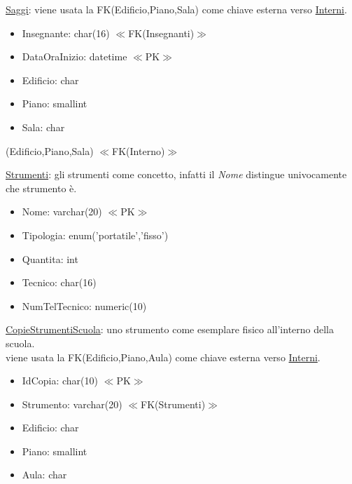 \documentclass{article}
\begin{document}
\medskip

\begin{flushleft}
\underline{Saggi}: viene usata la FK(Edificio,Piano,Sala) come chiave esterna verso \underline{Interni}.
\end{flushleft}

\begin{itemize}
\item Insegnante: char(16) $\ll$FK(Insegnanti)$\gg$
\item DataOraInizio: datetime $\ll$PK$\gg$
\item Edificio: char
\item Piano: smallint
\item Sala: char
\end{itemize}

(Edificio,Piano,Sala) $\ll$FK(Interno)$\gg$

\medskip

\begin{flushleft}
\underline{Strumenti}: gli strumenti come concetto, infatti il \emph{Nome} distingue univocamente che strumento è.
\end{flushleft}

\begin{itemize}
\item Nome: varchar(20) $\ll$PK$\gg$
\item Tipologia: enum('portatile','fisso')
\item Quantita: int
\item Tecnico: char(16)
\item NumTelTecnico: numeric(10)	
\end{itemize}

\medskip

\begin{flushleft}
\underline{CopieStrumentiScuola}: uno strumento come esemplare fisico all'interno della scuola.\smallskip \\ \hspace{100pt}  viene usata la FK(Edificio,Piano,Aula) come chiave esterna verso \underline{Interni}.
\end{flushleft}

\begin{itemize}
\item IdCopia: char(10)  $\ll$PK$\gg$
\item Strumento: varchar(20)  $\ll$FK(Strumenti)$\gg$
\item Edificio: char
\item Piano: smallint
\item Aula: char
\end{itemize}
\end{document}
